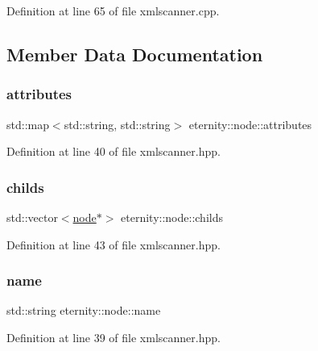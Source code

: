 Definition at line 65 of file xmlscanner.\+cpp.



\subsection{Member Data Documentation}
\mbox{\label{classeternity_1_1node_af12d6ec498fd30def4c6b4f21fa181c7}} 
\subsubsection{\texorpdfstring{attributes}{attributes}}
{\footnotesize\ttfamily std\+::map$<$std\+::string, std\+::string$>$ eternity\+::node\+::attributes}



Definition at line 40 of file xmlscanner.\+hpp.

\mbox{\label{classeternity_1_1node_ac1d7dfa57dd7ad2c13f0d6e0594d7e7f}} 
\subsubsection{\texorpdfstring{childs}{childs}}
{\footnotesize\ttfamily std\+::vector$<$\hyperlink{classeternity_1_1node}{node}$\ast$$>$ eternity\+::node\+::childs}



Definition at line 43 of file xmlscanner.\+hpp.

\mbox{\label{classeternity_1_1node_aa58fec317429adb430f6d38b3660b69a}} 
\subsubsection{\texorpdfstring{name}{name}}
{\footnotesize\ttfamily std\+::string eternity\+::node\+::name}



Definition at line 39 of file xmlscanner.\+hpp.

\mbox{\label{classeternity_1_1node_a11a3dc9c5a20a7cae619e7bf69e09131}} 
